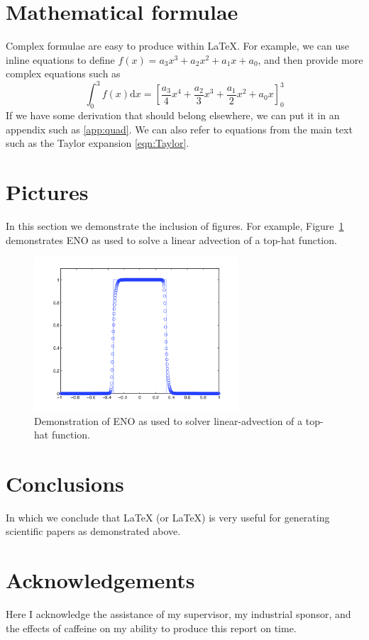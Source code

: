\documentclass[final,3p,times,twocolumn]{elsarticle}
\numberwithin{equation}{section}
\begin{document}
\section{Mathematical formulae}
\label{sect:Formulae}
Complex formulae are easy to produce within \LaTeX{}. For example, we
can use inline equations to define $f(x) = a_3x^3 + a_2x^2 + a_1x +
a_0$, and then provide more complex equations such as
\begin{equation}
\int_0^3 f(x) \mathrm{d}x = \left[\frac{a_3}{4}x^4 + \frac{a_2}{3}x^3
  + \frac{a_1}{2}x^2 + a_0x\right]_0^3
\label{eqn:Taylor}
\end{equation}
If we have some derivation that should belong elsewhere, we can put it
in an appendix such as \ref{app:quad}. We can also refer to equations
from the main text such as the Taylor expansion \ref{eqn:Taylor}.
\section{Pictures}
\label{sect:Pictures}
In this section we demonstrate the inclusion of figures. For example,
Figure~\ref{fig:ENO1} demonstrates ENO as used to solve a linear advection
of a top-hat function.
\begin{figure}
\centering
\includegraphics[width=3in]{ENOTest3b.png}
\caption{Demonstration of ENO as used to solver linear-advection of a
  top-hat function.}
\label{fig:ENO1}
\end{figure}
\section{Conclusions}
\label{sect:Concl}
In which we conclude that LaTeX (or \LaTeX) is very useful for
generating scientific papers as demonstrated above.

\section*{Acknowledgements}
Here I acknowledge the assistance of my supervisor, my industrial sponsor,
and the effects of caffeine on my ability to produce this report on time.
\end{document}
